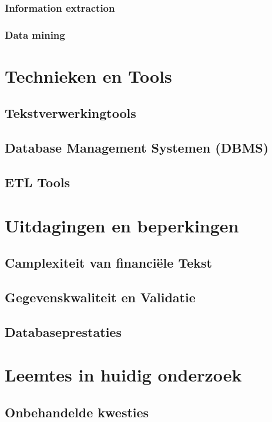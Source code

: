 \subsubsection{Information extraction}
\subsubsection{Data mining}


\section{Technieken en Tools}
\subsection{Tekstverwerkingtools}
\subsection{Database Management Systemen (DBMS)}
\subsection{ETL Tools}



\section{Uitdagingen en beperkingen}
\subsection{Camplexiteit van financiële Tekst}
\subsection{Gegevenskwaliteit en Validatie}
\subsection{Databaseprestaties}
\section{Leemtes in huidig onderzoek}
\subsection{Onbehandelde kwesties}
